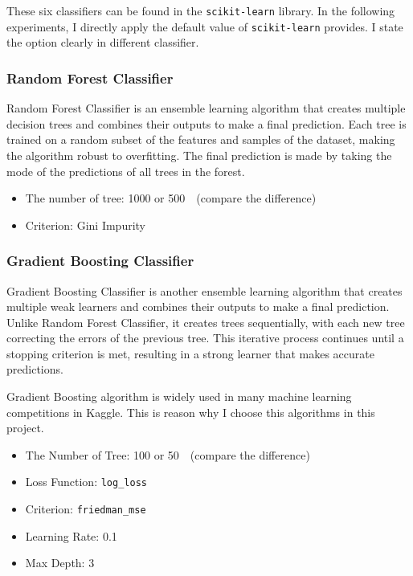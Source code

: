 \documentclass[twocolumn, draft]{extarticle}
\begin{document}
These six classifiers can be found in the \texttt{scikit-learn} library. In the following experiments, I directly apply the default value of \texttt{scikit-learn} provides. I state the option clearly in different classifier.

\subsubsection{Random Forest Classifier}

Random Forest Classifier is an ensemble learning algorithm that creates multiple decision trees and combines their outputs to make a final prediction. Each tree is trained on a random subset of the features and samples of the dataset, making the algorithm robust to overfitting. The final prediction is made by taking the mode of the predictions of all trees in the forest.

\begin{itemize}
\item The number of tree: 1000 or 500　(compare the difference)
\item Criterion: Gini Impurity
\end{itemize}

\subsubsection{Gradient Boosting Classifier}

Gradient Boosting Classifier is another ensemble learning algorithm that creates multiple weak learners and combines their outputs to make a final prediction. Unlike Random Forest Classifier, it creates trees sequentially, with each new tree correcting the errors of the previous tree. This iterative process continues until a stopping criterion is met, resulting in a strong learner that makes accurate predictions.

Gradient Boosting algorithm is widely used in many machine learning competitions in Kaggle. This is reason why I choose this algorithms in this project.

\begin{itemize}
\item The Number of Tree: 100 or 50　(compare the difference)
\item Loss Function: \texttt{log\_loss}
\item Criterion: \texttt{friedman\_mse}
\item Learning Rate: 0.1
\item Max Depth: 3
\end{itemize}
\end{document}
